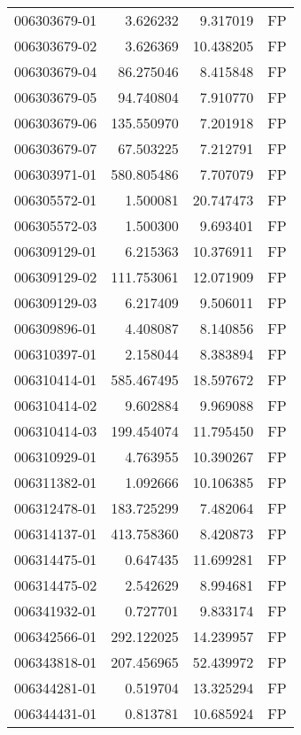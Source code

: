 \begin{tabular}{lrrl}
006303679-01 &    3.626232 &       9.317019 &   FP \\
006303679-02 &    3.626369 &      10.438205 &   FP \\
006303679-04 &   86.275046 &       8.415848 &   FP \\
006303679-05 &   94.740804 &       7.910770 &   FP \\
006303679-06 &  135.550970 &       7.201918 &   FP \\
006303679-07 &   67.503225 &       7.212791 &   FP \\
006303971-01 &  580.805486 &       7.707079 &   FP \\
006305572-01 &    1.500081 &      20.747473 &   FP \\
006305572-03 &    1.500300 &       9.693401 &   FP \\
006309129-01 &    6.215363 &      10.376911 &   FP \\
006309129-02 &  111.753061 &      12.071909 &   FP \\
006309129-03 &    6.217409 &       9.506011 &   FP \\
006309896-01 &    4.408087 &       8.140856 &   FP \\
006310397-01 &    2.158044 &       8.383894 &   FP \\
006310414-01 &  585.467495 &      18.597672 &   FP \\
006310414-02 &    9.602884 &       9.969088 &   FP \\
006310414-03 &  199.454074 &      11.795450 &   FP \\
006310929-01 &    4.763955 &      10.390267 &   FP \\
006311382-01 &    1.092666 &      10.106385 &   FP \\
006312478-01 &  183.725299 &       7.482064 &   FP \\
006314137-01 &  413.758360 &       8.420873 &   FP \\
006314475-01 &    0.647435 &      11.699281 &   FP \\
006314475-02 &    2.542629 &       8.994681 &   FP \\
006341932-01 &    0.727701 &       9.833174 &   FP \\
006342566-01 &  292.122025 &      14.239957 &   FP \\
006343818-01 &  207.456965 &      52.439972 &   FP \\
006344281-01 &    0.519704 &      13.325294 &   FP \\
006344431-01 &    0.813781 &      10.685924 &   FP \\

\end{tabular}
